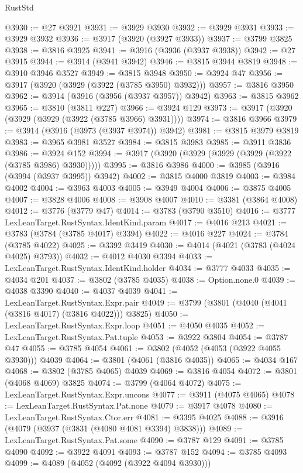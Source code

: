 \begin{lexlean}{RustStd}
\begin{coremodule}
@3930 := @27 @3921
@3931 := @3929 @3930
@3932 := @3929 @3931
@3933 := @3929 @3932
@3936 := @3917 (@3920 (@3927 @3933))
@3937 := @3799 @3825
@3938 := @3816 @3925
@3941 := @3916 (@3936 (@3937 @3938))
@3942 := @27 @3915
@3944 := @3914 (@3941 @3942)
@3946 := @3815 @3944 @3819
@3948 := @3910 @3946 @3527
@3949 := @3815 @3948
@3950 := @3924 @47
@3956 := @3917 (@3920 (@3929 (@3922 (@3785 @3950) @3932)))
@3957 := @3816 @3950
@3962 := @3914 (@3916 (@3956 (@3937 @3957)) @3942)
@3963 := @3815 @3962
@3965 := @3810 (@3811 @227)
@3966 := @3924 @129
@3973 := @3917 (@3920 (@3929 (@3929 (@3922 (@3785 @3966) @3931))))
@3974 := @3816 @3966
@3979 := @3914 (@3916 (@3973 (@3937 @3974)) @3942)
@3981 := @3815 @3979 @3819
@3983 := @3965 @3981 @3527
@3984 := @3815 @3983
@3985 := @3911 @3836
@3986 := @3924 @152
@3994 := @3917 (@3920 (@3929 (@3929 (@3929 (@3922 (@3785 @3986) @3930)))))
@3995 := @3816 @3986
@4000 := @3985 (@3916 (@3994 (@3937 @3995)) @3942)
@4002 := @3815 @4000 @3819
@4003 := @3984 @4002
@4004 := @3963 @4003
@4005 := @3949 @4004
@4006 := @3875 @4005
@4007 := @3828 @4006
@4008 := @3908 @4007
@4010 := @3381 (@3864 @4008)
@4012 := @3776 (@3779 @47)
@4014 := @3783 (@3790 @3510)
@4016 := @3777 LexLeanTarget.RustSyntax.IdentKind.param
@4017 := @4016 @213
@4021 := @3783 (@3784 (@3785 @4017) @3394)
@4022 := @4016 @227
@4024 := @3784 (@3785 @4022)
@4025 := @3392 @3419
@4030 := @4014 (@4021 (@3783 (@4024 @4025) @3793))
@4032 := @4012 @4030 @3394
@4033 := LexLeanTarget.RustSyntax.IdentKind.holder
@4034 := @3777 @4033
@4035 := @4034 @201
@4037 := @3802 (@3785 @4035)
@4038 := Option.none.{0}
@4039 := @4038 @3390
@4040 := @4037 @4039
@4041 := LexLeanTarget.RustSyntax.Expr.pair
@4049 := @3799 (@3801 (@4040 (@4041 (@3816 @4017) (@3816 @4022))) @3825)
@4050 := LexLeanTarget.RustSyntax.Expr.loop
@4051 := @4050 @4035
@4052 := LexLeanTarget.RustSyntax.Pat.tuple
@4053 := @3922 @3804
@4054 := @3787 @47
@4055 := @3785 @4054
@4061 := @3802 (@4052 (@4053 (@3922 @4055 @3930))) @4039
@4064 := @3801 (@4061 (@3816 @4035))
@4065 := @4034 @167
@4068 := @3802 (@3785 @4065) @4039
@4069 := @3816 @4054
@4072 := @3801 (@4068 @4069) @3825
@4074 := @3799 (@4064 @4072)
@4075 := LexLeanTarget.RustSyntax.Expr.uncons
@4077 := @3911 (@4075 @4065)
@4078 := LexLeanTarget.RustSyntax.Pat.none
@4079 := @3917 @4078
@4080 := LexLeanTarget.RustSyntax.Ctor.err
@4081 := @3395 @4025
@4088 := @3916 (@4079 (@3937 (@3831 (@4080 @4081 @3394) @3838)))
@4089 := LexLeanTarget.RustSyntax.Pat.some
@4090 := @3787 @129
@4091 := @3785 @4090
@4092 := @3922 @4091
@4093 := @3787 @152
@4094 := @3785 @4093
@4099 := @4089 (@4052 (@4092 (@3922 @4094 @3930)))

\end{coremodule}
\end{lexlean}
